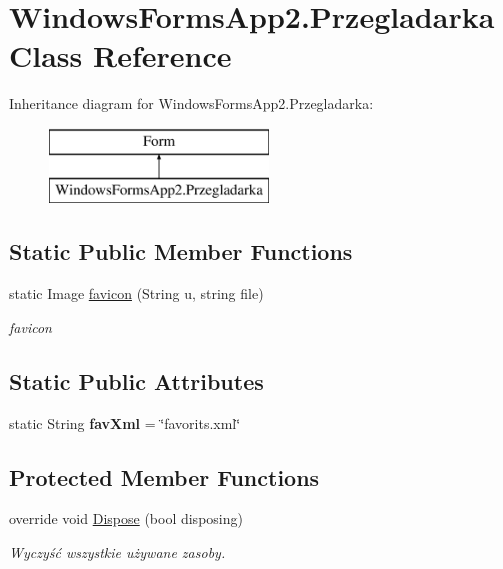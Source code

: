 \hypertarget{class_windows_forms_app2_1_1_przegladarka}{}\section{Windows\+Forms\+App2.\+Przegladarka Class Reference}
\label{class_windows_forms_app2_1_1_przegladarka}
Inheritance diagram for Windows\+Forms\+App2.\+Przegladarka\+:\begin{figure}[H]
\begin{center}
\leavevmode
\includegraphics[height=2.000000cm]{class_windows_forms_app2_1_1_przegladarka}
\end{center}
\end{figure}
\subsection*{Static Public Member Functions}
\begin{DoxyCompactItemize}
\item 
\mbox{\label{class_windows_forms_app2_1_1_przegladarka_a25874245b07b80396888b5c96bb67251}} 
static Image \hyperlink{class_windows_forms_app2_1_1_przegladarka_a25874245b07b80396888b5c96bb67251}{favicon} (String u, string file)
\begin{DoxyCompactList}\small\item\em favicon \end{DoxyCompactList}\end{DoxyCompactItemize}
\subsection*{Static Public Attributes}
\begin{DoxyCompactItemize}
\item 
\mbox{\label{class_windows_forms_app2_1_1_przegladarka_ab28068e2ce99fd06715ca76c9d1ba6ca}} 
static String {\bfseries fav\+Xml} = \char`\"{}favorits.\+xml\char`\"{}
\end{DoxyCompactItemize}
\subsection*{Protected Member Functions}
\begin{DoxyCompactItemize}
\item 
override void \hyperlink{class_windows_forms_app2_1_1_przegladarka_a1952e96668e9dae2dd62a80771162925}{Dispose} (bool disposing)
\begin{DoxyCompactList}\small\item\em Wyczyść wszystkie używane zasoby. \end{DoxyCompactList}\end{DoxyCompactItemize}
